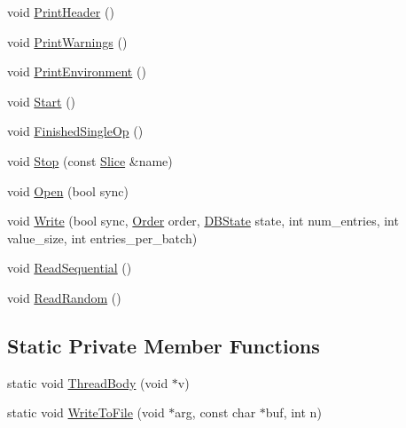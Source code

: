 \begin{DoxyCompactItemize}
\item 
void \hyperlink{classleveldb_1_1_benchmark_a15b286cc29560860abc89217e4b5c079}{Print\+Header} ()
\item 
void \hyperlink{classleveldb_1_1_benchmark_aa0b2a30493347ff50cbf28772cfaca9d}{Print\+Warnings} ()
\item 
void \hyperlink{classleveldb_1_1_benchmark_ac99c8911fbe6bc43acd785cf28d3f5a7}{Print\+Environment} ()
\item 
void \hyperlink{classleveldb_1_1_benchmark_a425b045a0e0adc6bf680e5928bbe6047}{Start} ()
\item 
void \hyperlink{classleveldb_1_1_benchmark_acca3e72cfbf640d11acae8d58344ee48}{Finished\+Single\+Op} ()
\item 
void \hyperlink{classleveldb_1_1_benchmark_a65d0797253a00efc34b160a59aeb77c1}{Stop} (const \hyperlink{classleveldb_1_1_slice}{Slice} \&name)
\item 
void \hyperlink{classleveldb_1_1_benchmark_aa4cb9514dd070f754d13e7cd585ae2a6}{Open} (bool sync)
\item 
void \hyperlink{classleveldb_1_1_benchmark_aabf4d3f9eb9062f6cbf4ee9771da4827}{Write} (bool sync, \hyperlink{classleveldb_1_1_benchmark_a4694fe0f2fd06d7da386305a339ddbc4}{Order} order, \hyperlink{classleveldb_1_1_benchmark_ad94bd817d74359a4d8cea6da609a28d4}{D\+B\+State} state, int num\+\_\+entries, int value\+\_\+size, int entries\+\_\+per\+\_\+batch)
\item 
void \hyperlink{classleveldb_1_1_benchmark_a301897d0609459c5e6072db05da6b737}{Read\+Sequential} ()
\item 
void \hyperlink{classleveldb_1_1_benchmark_ac822394de61c12dd6a8a0e0c64760da5}{Read\+Random} ()
\end{DoxyCompactItemize}
\subsection*{Static Private Member Functions}
\begin{DoxyCompactItemize}
\item 
static void \hyperlink{classleveldb_1_1_benchmark_a89b8e81e1e114527f7096bf333de426c}{Thread\+Body} (void $\ast$v)
\item 
static void \hyperlink{classleveldb_1_1_benchmark_a1e16eff8e9a6acef8679f293916ad01a}{Write\+To\+File} (void $\ast$arg, const char $\ast$buf, int n)
\end{DoxyCompactItemize}
